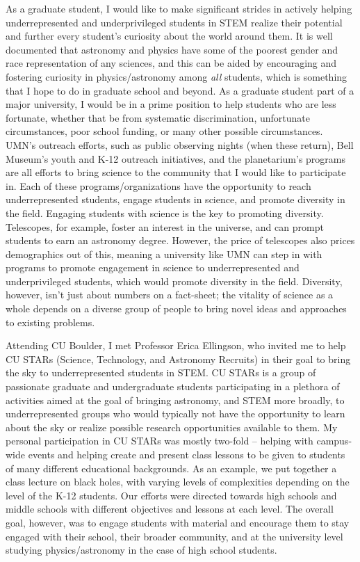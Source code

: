 \documentclass[11pt,letterpaper]{article}
\begin{document}
As a graduate student, I would like to make significant strides in actively helping underrepresented and underprivileged students in STEM realize their potential and further every student's curiosity about the world around them. It is well documented that astronomy and physics have some of the poorest gender and race representation of any sciences, and this can be aided by encouraging and fostering curiosity in physics/astronomy among \textit{all} students, which is something that I hope to do in graduate school and beyond. As a graduate student part of a major university, I would be in a prime position to help students who are less fortunate, whether that be from systematic discrimination, unfortunate circumstances, poor school funding, or many other possible circumstances. UMN's outreach efforts, such as public observing nights (when these return), Bell Museum's youth and K-12 outreach initiatives, and the planetarium's programs are all efforts to bring science to the community that I would like to participate in. Each of these programs/organizations have the opportunity to reach underrepresented students, engage students in science, and promote diversity in the field. Engaging students with science is the key to promoting diversity. Telescopes, for example, foster an interest in the universe, and can prompt students to earn an astronomy degree. However, the price of telescopes also prices demographics out of this, meaning a university like UMN can step in with programs to promote engagement in science to underrepresented and underprivileged students, which would promote diversity in the field. Diversity, however, isn't just about numbers on a fact-sheet; the vitality of science as a whole depends on a diverse group of people to bring novel ideas and approaches to existing problems.

Attending CU Boulder, I met Professor Erica Ellingson, who invited me to help CU STARs (Science, Technology, and Astronomy Recruits) in their goal to bring the sky to underrepresented students in STEM. CU STARs is a group of passionate graduate and undergraduate students participating in a plethora of activities aimed at the goal of bringing astronomy, and STEM more broadly, to underrepresented groups who would typically not have the opportunity to learn about the sky or realize possible research opportunities available to them. My personal participation in CU STARs was mostly two-fold -- helping with campus-wide events and helping create and present class lessons to be given to students of many different educational backgrounds. As an example, we put together a class lecture on black holes, with varying levels of complexities depending on the level of the K-12 students. Our efforts were directed towards high schools and middle schools with different objectives and lessons at each level. The overall goal, however, was to engage students with material and encourage them to stay engaged with their school, their broader community, and at the university level studying physics/astronomy in the case of high school students.
\end{document}

